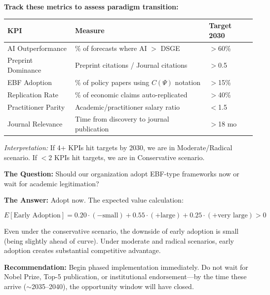 \begin{tcolorbox}[colback=purple!5!white, colframe=purple!75!black,
    title=\textbf{KEY PERFORMANCE INDICATORS (KPIs)}]

\textbf{Track these metrics to assess paradigm transition:}

\renewcommand{\arraystretch}{1.3}
\begin{tabular}{@{}lp{5cm}l@{}}
\toprule
\textbf{KPI} & \textbf{Measure} & \textbf{Target 2030} \\
\midrule
AI Outperformance & \% of forecasts where AI $>$ DSGE & $>$60\% \\
Preprint Dominance & Preprint citations / Journal citations & $>$0.5 \\
EBF Adoption & \% of policy papers using $C(\Psi)$ notation & $>$15\% \\
Replication Rate & \% of economic claims auto-replicated & $>$40\% \\
Practitioner Parity & Academic/practitioner salary ratio & $<$1.5 \\
Journal Relevance & Time from discovery to journal publication & $>$18 mo \\
\bottomrule
\end{tabular}

\textit{Interpretation:} If 4+ KPIs hit targets by 2030, we are in Moderate/Radical scenario.
If $<$2 KPIs hit targets, we are in Conservative scenario.

\end{tcolorbox}

\begin{tcolorbox}[colback=gray!5!white, colframe=gray!75!black,
    title=\textbf{BOTTOM LINE}]

\textbf{The Question:} Should our organization adopt EBF-type frameworks now or wait
for academic legitimation?

\textbf{The Answer:} Adopt now. The expected value calculation:

\begin{equation*}
E[\text{Early Adoption}] = 0.20 \cdot (-\text{small}) + 0.55 \cdot (+\text{large}) + 0.25 \cdot (+\text{very large}) > 0
\end{equation*}

Even under the conservative scenario, the downside of early adoption is small (being
slightly ahead of curve). Under moderate and radical scenarios, early adoption
creates substantial competitive advantage.

\textbf{Recommendation:} Begin phased implementation immediately. Do not wait for
Nobel Prize, Top-5 publication, or institutional endorsement---by the time these
arrive ($\sim$2035--2040), the opportunity window will have closed.

\end{tcolorbox}


